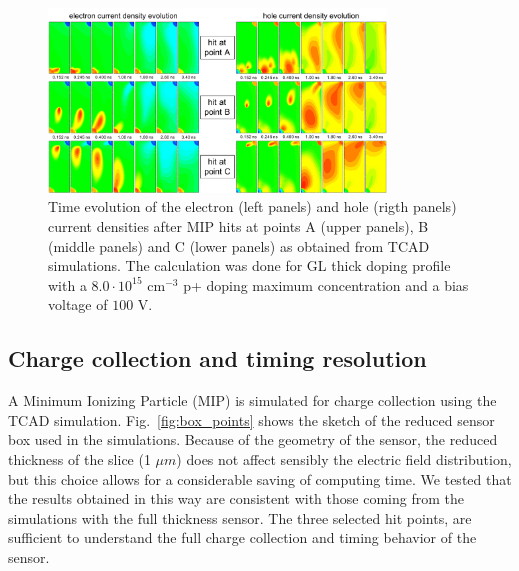 \documentclass[aps,pt14,superscriptaddress,floatfix,nofootinbib]{revtex4}
\begin{document}
\begin{figure}[hbtp]
\begin{center}
\includegraphics[width=0.80\textwidth,keepaspectratio]{figures1/MIP_current_evolution_ABC.pdf}\hspace{0.7cm}
\caption{Time evolution of the electron (left panels) and hole (rigth panels) current densities after MIP hits at points A (upper panels), B (middle panels) and C (lower panels) as obtained from TCAD simulations. The calculation was done for GL thick doping profile with a $8.0\cdot 10^{15}$ cm$^{-3}$ p+ doping maximum concentration and a bias voltage of $100$ V.\label{fig:MIP-timeevolution}}  
\end{center}
\end{figure}



\subsection{Charge collection and timing resolution} 

A Minimum Ionizing Particle (MIP) is simulated for charge collection using the TCAD simulation. Fig.~\ref{fig:box_points} shows the sketch of the reduced sensor box used in the simulations. Because of the geometry of the sensor, the reduced thickness of the slice (1 $\mu m$) does not affect sensibly the electric field distribution, but this choice allows for a considerable saving of computing time. We tested that the results obtained in this way are consistent with those coming from the simulations with the full thickness sensor. The three selected hit points, are sufficient to understand the full charge collection and timing behavior of the sensor.    
 
\end{document}

